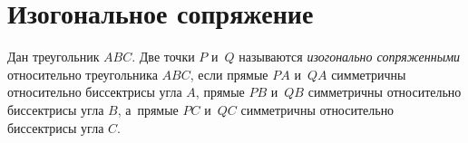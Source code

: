 
\section*{Изогональное сопряжение}


Дан треугольник $ABC$.
Две точки $P$ и~$Q$ называются \emph{изогонально сопряженными} относительно
треугольника $ABC$, если прямые $PA$ и~$QA$ симметричны относительно
биссектрисы угла $A$, прямые $PB$ и~$QB$ симметричны относительно биссектрисы
угла $B$, а~прямые $PC$ и~$QC$ симметричны относительно биссектрисы угла $C$.

